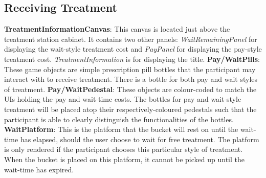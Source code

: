 \documentclass{article}
\begin{document}
\subsection*{Receiving Treatment}
\textbf{TreatmentInformationCanvas}: This canvas is located just above the treatment station cabinet. It contains two other panels: \textit{WaitRemainingPanel} for displaying the wait-style treatment cost and \textit{PayPanel} for displaying the pay-style treatment cost. \textit{TreatmentInformation} is for displaying the title. \newline \newline
\textbf{Pay\slash WaitPills}: These game objects are simple prescription pill bottles that the participant may interact with to receive treatment. There is a bottle for both pay and wait styles of treatment. \newline \newline
\textbf{Pay\slash WaitPedestal}: These objects are colour-coded to match the UIs holding the pay and wait-time costs. The bottles for pay and wait-style treatment will be placed atop their respectively-coloured pedestals such that the participant is able to clearly distinguish the functionalities of the bottles. \newline \newline
\textbf{WaitPlatform}: This is the platform that the bucket will rest on until the wait-time has elapsed, should the user choose to wait for free treatment. The platform is only rendered if the participant chooses this particular style of treatment. When the bucket is placed on this platform, it cannot be picked up until the wait-time has expired.
\end{document}
